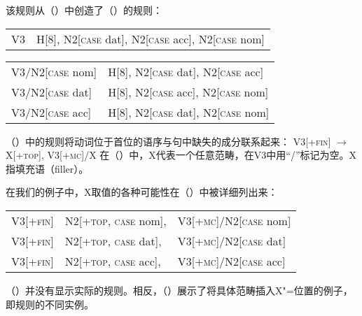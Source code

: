 \noindent
该规则从（）中创造了（）的规则：
\ea
\begin{tabular}[t]{@{}l@{~$\to$~}l@{}}
V3  & H[8], N2[\textsc{case} dat], N2[\textsc{case} acc], N2[\textsc{case} nom] 
\end{tabular}
\z
\ea
\begin{tabular}[t]{@{}l@{~$\to$~}l@{}}
V3/N2[\textsc{case} nom] &  H[8], N2[\textsc{case} dat], N2[\textsc{case} acc]\\
V3/N2[\textsc{case} dat] &  H[8], N2[\textsc{case} acc], N2[\textsc{case} nom]\\
V3/N2[\textsc{case} acc] &  H[8], N2[\textsc{case} dat], N2[\textsc{case} nom]\\
\end{tabular}
\z

\noindent
（）中的规则将动词位于首位的语序与句中缺失的成分联系起来：
\ea
\label{gpsg-vs-regel}
V3[+\textsc{fin}] $\to$ X[+\textsc{top}], V3[+\textsc{mc}]/X
\z
在（）中，X代表一个任意范畴，在V3中用“/”标记为空。X指填充语（filler）。

在我们的例子中，X取值的各种可能性在（）中被详细列出来：
\ea
\begin{tabular}[t]{@{}l@{~$\to$~}l@{~}l@{}}
V3[+\textsc{fin}] & N2[+\textsc{top}, \textsc{case} nom], & V3[+\textsc{mc}]/N2[\textsc{case} nom]\\
V3[+\textsc{fin}] & N2[+\textsc{top}, \textsc{case} dat], & V3[+\textsc{mc}]/N2[\textsc{case} dat]\\
V3[+\textsc{fin}] & N2[+\textsc{top}, \textsc{case} acc], & V3[+\textsc{mc}]/N2[\textsc{case} acc]\\
\end{tabular}
\z
（）并没有显示实际的规则。相反，（）展示了将具体范畴插入X"=位置的例子，即规则的不同实例。


